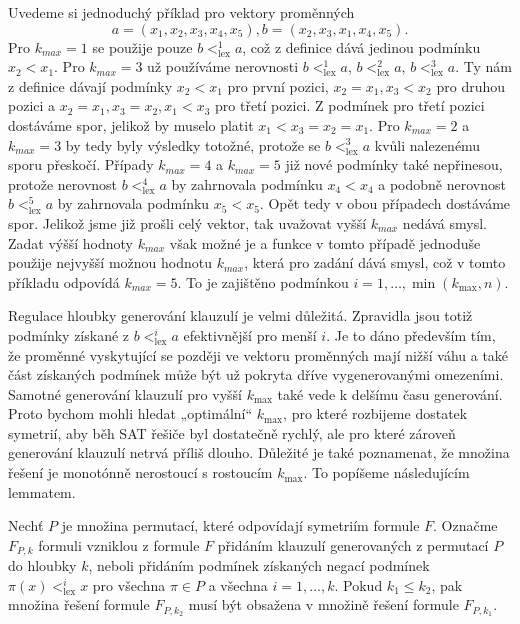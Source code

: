 \begin{prikl}
Uvedeme si jednoduchý příklad pro vektory proměnných $$a=(x_1, x_2, x_3, x_4, x_5), b=(x_2, x_3, x_1, x_4, x_5).$$ Pro $k_{max}=1$ se použije pouze $b <^1_{\text{lex}} a$, což z definice dává jedinou podmínku $x_2<x_1$. Pro $k_{max}=3$ už používáme nerovnosti $b <^1_{\text{lex}} a$, $b <^2_{\text{lex}} a$, $b <^3_{\text{lex}} a$. Ty nám z definice dávají podmínky $x_2<x_1$ pro první pozici, $x_2 = x_1, x_3 < x_2$ pro druhou pozici a $x_2 = x_1, x_3 = x_2, x_1<x_3$ pro třetí pozici. Z podmínek pro třetí pozici dostáváme spor, jelikož by muselo platit $x_1<x_3=x_2=x_1$. Pro $k_{max}=2$ a $k_{max}=3$ by tedy byly výsledky totožné, protože se $b <^3_{\text{lex}} a$ kvůli nalezenému sporu přeskočí. Případy $k_{max}=4$ a $k_{max}=5$ již nové podmínky také nepřinesou, protože nerovnost $b <^4_{\text{lex}} a$ by zahrnovala podmínku $x_4<x_4$ a podobně nerovnost $b <^5_{\text{lex}} a$ by zahrnovala podmínku $x_5<x_5$. Opět tedy v obou případech dostáváme spor. Jelikož jsme již prošli celý vektor, tak uvažovat vyšší $k_{max}$ nedává smysl. Zadat výšší hodnoty $k_{max}$ však možné je a funkce v tomto případě jednoduše použije nejvyšší možnou hodnotu $k_{max}$, která pro zadání dává smysl, což v tomto příkladu odpovídá $k_{max}=5$. To je zajištěno podmínkou $i = 1,\ldots,\min(k_{\max},n)$.
\end{prikl}

Regulace hloubky generování klauzulí je velmi důležitá. Zpravidla jsou totiž podmínky získané z $b <^i_{\text{lex}} a$ efektivnější pro menší $i$. Je to dáno především tím, že proměnné vyskytující se později ve vektoru proměnných mají nižší váhu a také část získaných podmínek může být už pokryta dříve vygenerovanými omezeními. Samotné generování klauzulí pro vyšší $k_{\max}$ také vede k delšímu času generování. Proto bychom mohli hledat „optimální“ $k_{\max}$, pro které rozbijeme dostatek symetrií, aby běh SAT řešiče byl dostatečně rychlý, ale pro které zároveň generování klauzulí netrvá příliš dlouho. Důležité je také poznamenat, že množina řešení je monotónně nerostoucí s rostoucím $k_{\max}$. To popíšeme následujícím lemmatem.

\begin{lemma}
Nechť $P$ je množina permutací, které odpovídají symetriím formule $F$. Označme $F_{P,k}$ formuli vzniklou z formule $F$ přidáním klauzulí generovaných z permutací $P$ do hloubky $k$, neboli přidáním podmínek získaných negací podmínek $\pi(x) <^i_{\text{lex}} x$ pro všechna $\pi \in P$ a všechna $i=1,...,k$. Pokud $k_1\leq k_2$, pak množina řešení formule $F_{P,k_2}$ musí být obsažena v množině řešení formule $F_{P,k_1}$.
\end{lemma}

